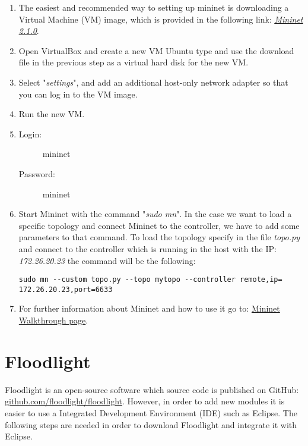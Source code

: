 \begin{enumerate}
\item The easiest and recommended way to setting up mininet is downloading a Virtual Machine (VM) image, which is provided in the following link:  \emph{\underline{\href{https://bitbucket.org/mininet/mininet-vm-images/downloads}{Mininet 2.1.0}}}.
\item Open VirtualBox and create a new VM Ubuntu type and use the download file in the previous step as a virtual hard disk for the new VM.
\item Select "\emph{settings}", and add an additional host-only network adapter so that you can log in to the VM image.
\item Run the new VM.
\item 
\begin{description}
\item[Login:] mininet
\item[Password:] mininet 
\end{description}
\item Start Mininet with the command "\emph{sudo mn}". In the case we want to load a specific topology and connect Mininet to the controller,  we have to add some parameters to that command. To load the topology specify in the file \emph{topo.py} and connect to the controller which is running in the host with the IP: \emph{172.26.20.23} the command will be the following:\\   

\begin{verbatim}
sudo mn --custom topo.py --topo mytopo --controller remote,ip=
172.26.20.23,port=6633

\end{verbatim}

\item For further information about Mininet and how to use it go to: \href{http://mininet.org/walkthrough/#part-1-everyday-mininet-usage}{Mininet Walkthrough page}.

\end{enumerate}


\section {Floodlight}

Floodlight is an open-source software which source code is published on GitHub: \\\underline{\href{https://github.com/floodlight/floodlight}{github.com/floodlight/floodlight}}. However, in order to add new modules it is easier to use a Integrated Development Environment (IDE) such as Eclipse. The following steps are needed in order to download Floodlight and integrate it with Eclipse.\\

